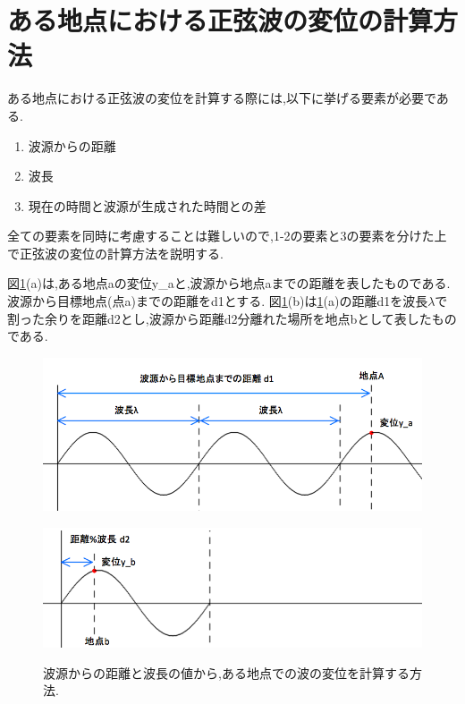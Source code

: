 \section{ある地点における正弦波の変位の計算方法}
ある地点における正弦波の変位を計算する際には,以下に挙げる要素が必要である.
\begin{enumerate}
 \item 波源からの距離
 \item 波長
 \item 現在の時間と波源が生成された時間との差
 \end{enumerate}
全ての要素を同時に考慮することは難しいので,1-2の要素と3の要素を分けた上で正弦波の変位の計算方法を説明する.

図\ref{fig:dislam}(a)は,ある地点aの変位y\_aと,波源から地点aまでの距離を表したものである.波源から目標地点(点a)までの距離をd1とする.
図\ref{fig:dislam}(b)は\ref{fig:dislam}(a)の距離d1を波長$λ$で割った余りを距離d2とし,波源から距離d2分離れた場所を地点bとして表したものである.




\begin{figure}[htbp]

\begin{minipage}[b]{1.0\linewidth}
\centering
  \includegraphics[keepaspectratio, scale=0.45]
  {../background/dislam1.png}
 \label{dislam1}
 \end{minipage}
  
  \begin{minipage}[b]{1.0\linewidth}
\centering
  \includegraphics[keepaspectratio, scale=0.45]
  {../background/dislam2.png}
 \label{dislam2}
 \end{minipage}
  
  \caption{波源からの距離と波長の値から,ある地点での波の変位を計算する方法.}
 \label{fig:dislam}
\end{figure}











